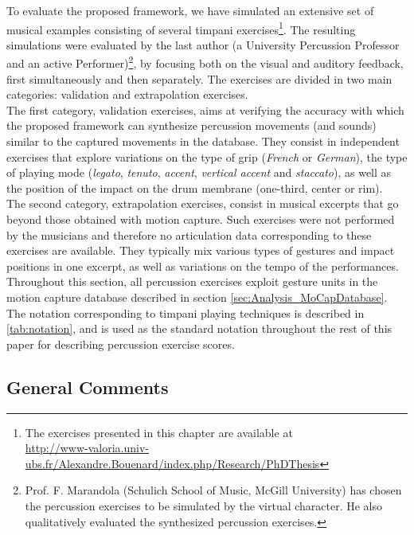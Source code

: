 To evaluate the proposed framework, we have simulated an extensive set of musical examples consisting of several timpani exercises\footnote{The exercises presented in this chapter are available at\\ \href{http://www-valoria.univ-ubs.fr/Alexandre.Bouenard/index.php/Research/PhDThesis}{http://www-valoria.univ-ubs.fr/Alexandre.Bouenard/index.php/Research/PhDThesis}}. The resulting simulations were evaluated by the last author (a University Percussion Professor and an active Performer)\footnote{Prof. F. Marandola (Schulich School of Music, McGill University) has chosen the percussion exercises to be simulated by the virtual character. He also qualitatively evaluated the synthesized percussion exercises.}, by focusing both on the visual and auditory feedback, first simultaneously and then separately. The exercises are divided in two main categories: validation and extrapolation exercises.\\

The first category, validation exercises, aims at verifying the accuracy with which the proposed framework can synthesize percussion movements (and sounds) similar to the captured movements in the database. They consist in independent exercises that explore variations on the type of grip (\emph{French} or \emph{German}), the type of playing mode (\emph{legato}, \emph{tenuto}, \emph{accent}, \emph{vertical accent} and \emph{staccato}), as well as the position of the impact on the drum membrane (one-third, center or rim).\\

The second category, extrapolation exercises, consist in musical excerpts that go beyond those obtained with motion capture. Such exercises were not performed by the musicians and therefore no articulation data corresponding to these exercises are available. They typically mix various types of gestures and impact positions in one excerpt, as well as variations on the tempo of the performances.\\

Throughout this section, all percussion exercises exploit gesture units in the motion capture database described in section \ref{sec:Analysis_MoCapDatabase}. The notation corresponding to timpani playing techniques is described in \mytabname \ref{tab:notation}, and is used as the standard notation throughout the rest of this paper for describing percussion exercise scores.


		\subsection{General Comments}
		\label{subsec:Music_Evaluation_GeneralCommments}

